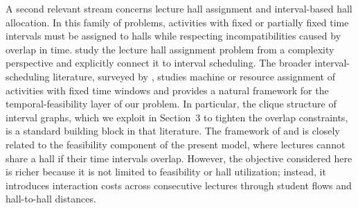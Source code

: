\documentclass[11pt]{article}
\begin{document}
A second relevant stream concerns lecture hall assignment and interval-based hall allocation. In this family of problems, activities with fixed or partially fixed time intervals must be assigned to halls while respecting incompatibilities caused by overlap in time. \citet{carter1992} study the lecture hall assignment problem from a complexity perspective and explicitly connect it to interval scheduling. The broader interval-scheduling literature, surveyed by \citet{kolen2007}, studies machine or resource assignment of activities with fixed time windows and provides a natural framework for the temporal-feasibility layer of our problem. In particular, the clique structure of interval graphs, which we exploit in Section~3 to tighten the overlap constraints, is a standard building block in that literature. The framework of \citet{carter1992} and \citet{kolen2007} is closely related to the feasibility component of the present model, where lectures cannot share a hall if their time intervals overlap. However, the objective considered here is richer because it is not limited to feasibility or hall utilization; instead, it introduces interaction costs across consecutive lectures through student flows and hall-to-hall distances.
\end{document}
